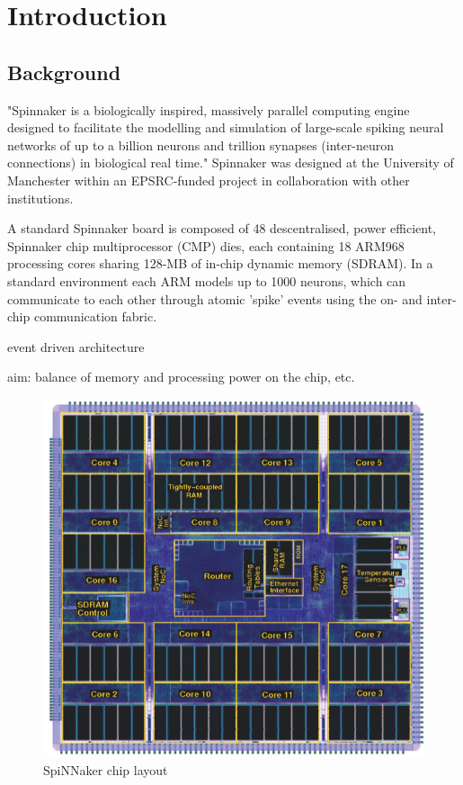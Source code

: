 \chapter{Introduction}
\label{cha:intro}

\section{Background}
\label{sec:background}

"Spinnaker is a biologically inspired, massively parallel computing engine designed to facilitate the modelling and simulation of large-scale spiking neural networks of up to a billion neurons and trillion synapses (inter-neuron connections) in biological real time."\cite{painkras} Spinnaker was designed at the University of Manchester within an EPSRC-funded project in collaboration with other institutions.

A standard Spinnaker board is composed of 48 descentralised, power efficient, Spinnaker chip multiprocessor (CMP) dies, each containing 18 ARM968 processing cores sharing 128-MB of in-chip dynamic memory (SDRAM). In a standard environment each ARM models up to 1000 neurons, which can communicate to each other through atomic 'spike' events using the on- and inter-chip communication fabric.\cite{datasheet}

event driven architecture


aim: balance of memory and processing power on the chip, etc.


\begin{figure}
\begin{center}
	\includegraphics[width=1\textwidth, natwidth=608, natheight=571]{images/chip.png}
\end{center}
\caption{SpiNNaker chip layout}
\label{fig:die-plot}
\end{figure}

